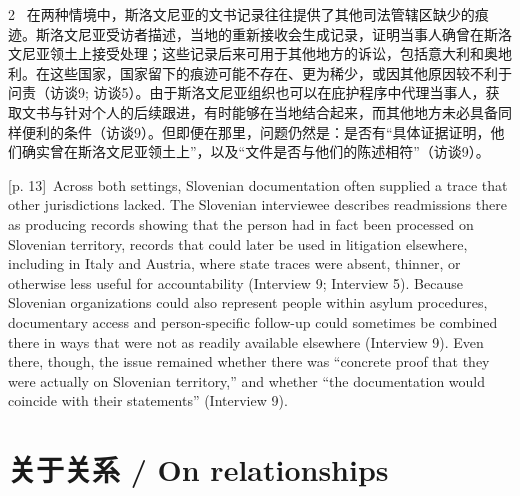 \documentclass[10pt,a4paper]{article}
\begin{document}
\begin{paracol}{2}
\switchcolumn*
{\scriptsize\color{gray} [p. 13]}\ 在两种情境中，斯洛文尼亚的文书记录往往提供了其他司法管辖区缺少的痕迹。斯洛文尼亚受访者描述，当地的重新接收会生成记录，证明当事人确曾在斯洛文尼亚领土上接受处理；这些记录后来可用于其他地方的诉讼，包括意大利和奥地利。在这些国家，国家留下的痕迹可能不存在、更为稀少，或因其他原因较不利于问责（访谈9; 访谈5）。由于斯洛文尼亚组织也可以在庇护程序中代理当事人，获取文书与针对个人的后续跟进，有时能够在当地结合起来，而其他地方未必具备同样便利的条件（访谈9）。但即便在那里，问题仍然是：是否有“具体证据证明，他们确实曾在斯洛文尼亚领土上”，以及“文件是否与他们的陈述相符”（访谈9）。\par
\switchcolumn
{\scriptsize\color{gray} [p. 13]}\ Across both settings, Slovenian documentation often supplied a trace that other jurisdictions lacked. The Slovenian interviewee describes readmissions there as producing records showing that the person had in fact been processed on Slovenian territory, records that could later be used in litigation elsewhere, including in Italy and Austria, where state traces were absent, thinner, or otherwise less useful for accountability (Interview 9; Interview 5). Because Slovenian organizations could also represent people within asylum procedures, documentary access and person-specific follow-up could sometimes be combined there in ways that were not as readily available elsewhere (Interview 9). Even there, though, the issue remained whether there was “concrete proof that they were actually on Slovenian territory,” and whether “the documentation would coincide with their statements” (Interview 9).\par
\switchcolumn*
\end{paracol}
\section*{关于关系 / On relationships}
\end{document}

